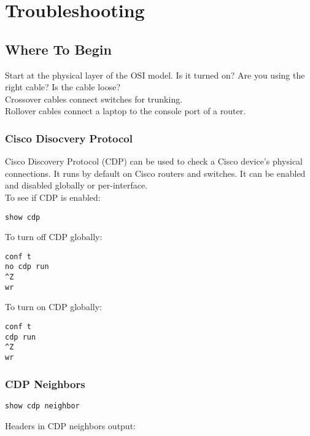 \section{Troubleshooting}

\subsection{Where To Begin}

Start at the physical layer of the OSI model. Is it turned on? Are you using
the right cable? Is the cable loose?\\

Crossover cables connect switches for trunking.\\

Rollover cables connect a laptop to the console port of a router.

\subsubsection{Cisco Disocvery Protocol}

Cisco Discovery Protocol (CDP) can be used to check a Cisco device's physical
connections. It runs by default on Cisco routers and switches. It can be
enabled and disabled globally or per-interface.\\

To see if CDP is enabled:

\begin{verbatim}
show cdp
\end{verbatim}

To turn off CDP globally:

\begin{verbatim}
conf t
no cdp run
^Z
wr
\end{verbatim}

To turn on CDP globally:

\begin{verbatim}
conf t
cdp run
^Z
wr
\end{verbatim}

\subsubsection{CDP Neighbors}

\begin{verbatim}
show cdp neighbor
\end{verbatim}

Headers in CDP neighbors output:

